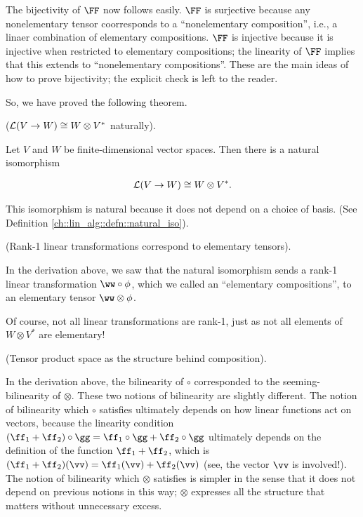 The bijectivity of $\FF$ now follows easily. $\FF$ is surjective because any nonelementary tensor coorresponds to a ``nonelementary composition'', i.e., a linaer combination of elementary compositions. $\FF$ is injective because it is injective when restricted to elementary compositions; the linearity of $\FF$ implies that this extends to ``nonelementary compositions''. These are the main ideas of how to prove bijectivity; the explicit check is left to the reader.

So, we have proved the following theorem.

\begin{theorem}
\label{ch::motivated_intro::thm::lin_V_W_iso_W_otimes_V}
    ($\mathcal{L}(V \rightarrow W) \cong W \otimes V^*$ naturally). 
    
    Let $V$ and $W$ be finite-dimensional vector spaces. Then there is a natural isomorphism
    
    \begin{align*}
        \mathcal{L}(V \rightarrow W) \cong W \otimes V^*.
    \end{align*}
    
    This isomorphism is natural because it does not depend on a choice of basis. (See Definition \ref{ch::lin_alg::defn::natural_iso}).
\end{theorem}

\begin{remark}
    (Rank-1 linear transformations correspond to elementary tensors).
    
    In the derivation above, we saw that the natural isomorphism sends a rank-1 linear transformation $\ww \circ \phi$, which we called an ``elementary compositions'', to an elementary tensor $\ww \otimes \phi$.
    
    Of course, not all linear transformations are rank-1, just as not all elements of $W \otimes V^*$ are elementary!
\end{remark}

\begin{remark}
    (Tensor product space as the structure behind composition).
    
    In the derivation above, the bilinearity of $\circ$ corresponded to the seeming-bilinearity of $\otimes$. These two notions of bilinearity are slightly different. The notion of bilinearity which $\circ$ satisfies ultimately depends on how linear functions act on vectors, because the linearity condition $(\ff_1 + \ff_2) \circ \gg = \ff_1 \circ \gg + \ff_2 \circ \gg$ ultimately depends on the definition of the function $\ff_1 + \ff_2$, which is $(\ff_1 + \ff_2)(\vv) = \ff_1(\vv) + \ff_2(\vv)$ (see, the vector $\vv$ is involved!). The notion of bilinearity which $\otimes$ satisfies is simpler in the sense that it does not depend on previous notions in this way; $\otimes$ expresses all the structure that matters without unnecessary excess.
\end{remark}

